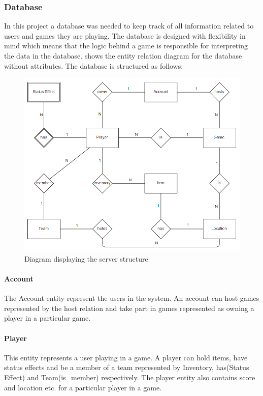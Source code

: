 \subsubsection{Database}\label{subsec:databasedesign}

In this project a database was needed to keep track of all information related to users and games they are playing. The database is designed with flexibility in mind which means that the logic behind a game is responsible for interpreting the data in the database.  shows the entity relation diagram for the database without attributes. The database is structured as follows:

\begin{figure}[H]
  \centering
  \includegraphics[width=\textwidth]{billeder/serverdiagram.png}  
  \caption{Diagram displaying the server structure}
  \label{fig:erdiagram}
\end{figure}

\paragraph{Account}
The Account entity represent the users in the system. An account can host games represented by the host relation and take part in games represented as owning a player in a particular game.

\paragraph{Player}
This entity represents a user playing in a game. A player can hold items, have status effects and be a member of a team represented by Inventory, has(Status Effect) and Team(is\_member) respectively. The player entity also contains score and location etc. for a particular player in a game.

